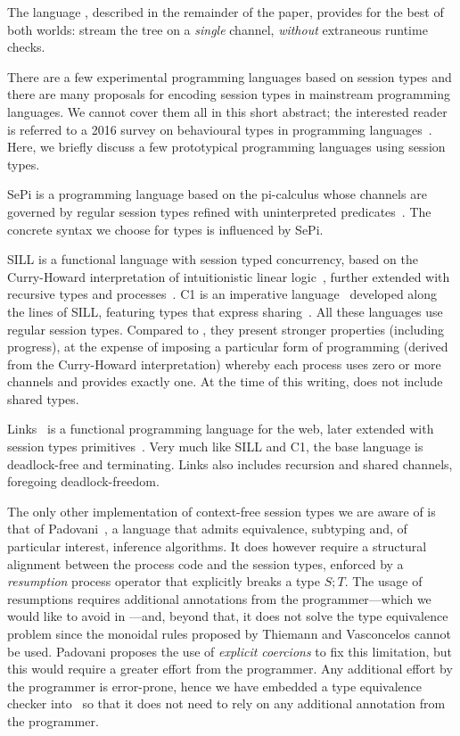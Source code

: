 The language \freest, described in the remainder of the paper, 
provides for the best
of both worlds: stream the tree on a \emph{single} channel,
\emph{without} extraneous runtime checks.


There are a few experimental programming languages based on session
types and there are many proposals for encoding session types in
mainstream programming languages. We cannot cover them all in
this short abstract; the interested reader is referred to a 2016
survey on behavioural types in programming
languages~\cite{DBLP:journals/ftpl/AnconaBB0CDGGGH16}.  Here, we briefly
discuss a few prototypical programming languages using session types.

SePi is a programming language based on the pi-calculus whose channels
are governed by regular session types refined with uninterpreted
predicates~\cite{DBLP:conf/sefm/FrancoV13}. The concrete syntax we
choose for \freest{} types is influenced by SePi.

SILL is a functional language with session typed concurrency, based on
the Curry-Howard interpretation of intuitionistic linear
logic~\cite{DBLP:conf/concur/CairesP10}, further extended with
recursive types and
processes~\cite{Toninho:phd,DBLP:conf/esop/ToninhoCP13}.
%
C1 is an imperative language~\cite{Pfenning:C1} developed along the
lines of SILL, featuring types that express
sharing~\cite{DBLP:journals/pacmpl/BalzerP17}.
%
All these languages use regular session types. Compared to \freest,
they present stronger properties (including progress), at the expense
of imposing a particular form of programming (derived from the
Curry-Howard interpretation) whereby each process uses zero or more
channels and provides exactly one. At the time of this writing,
\freest{} does not include shared types.

Links~\cite{DBLP:conf/fmco/CooperLWY06} is a functional programming
language for the web, later extended with session types
primitives~\cite{Lindley.Morris_Lightweight.functional.session.types}. Very
much like SILL and C1, the base language is deadlock-free and
terminating. Links also includes recursion and shared channels,
foregoing deadlock-freedom.

The only other implementation of context-free session types we are
aware of is that of Padovani~\cite{DBLP:conf/esop/Padovani17}, a
language that admits equivalence, subtyping and, of particular
interest, inference algorithms. It does however require a structural
alignment between the process code and the session types, enforced by
a \emph{resumption} process operator that explicitly breaks a type
$S;T$. The usage of resumptions requires additional annotations
from the programmer---which we would like to avoid in 
\freest---and, beyond that, it does not solve the type equivalence
problem since the monoidal rules proposed by Thiemann and
Vasconcelos cannot be used. Padovani proposes the use of 
\emph{explicit coercions} to fix this limitation, but this
would require a greater effort from the programmer. 
Any additional effort by the programmer is error-prone, hence
we have embedded a type equivalence checker into  
\freest\ so that it does not need to rely on any
additional annotation from the programmer.


